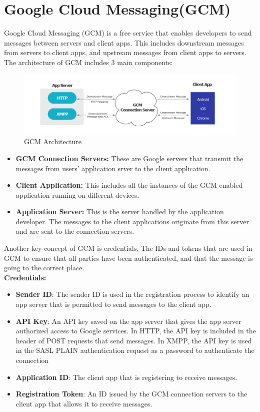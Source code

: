 \section{Google Cloud Messaging(GCM)}
Google Cloud Messaging (GCM) is a free service that enables developers
to send messages between servers and client apps. This includes
downstream messages from servers to client apps, and upstream
messages from client apps to servers. The architecture of GCM includes 3 main components:
\begin{figure}
\centering
\includegraphics[width=15cm]{images/arch.png}
\caption{\label{fig:arch}GCM Architecture}
\end{figure} 
\begin{itemize}
	    \item \textbf{GCM Connection Servers: }These are Google servers that transmit the messages from users' application srver to the client application.
	    \item \textbf{Client Application: }This includes all the instances of the GCM enabled application running on different devices.
	    \item \textbf{Application Server: }This is the server handled by the application developer. The messages to the client applications originate from this server and are sent to the connection servers.
  \end{itemize}

Another key concept of GCM is credentials, The IDs and tokens that are used in GCM to ensure that all parties have been authenticated, and that the message is going to the correct place.\\
\textbf{Credentials:}
\begin{itemize}
	    \item \textbf{Sender ID}: The sender ID is used in the registration process to identify an app server that is permitted to send messages to the client app.
	    \item \textbf{API Key}: An API key saved on the app server that gives the app server authorized access to Google services. In HTTP, the API key is included in the header of POST requests that send messages. In XMPP, the API key is used in the SASL PLAIN authentication request as a password to authenticate the connection
	    \item \textbf{Application ID}: The client app that is registering to receive messages.
	    \item \textbf{Registration Token}: An ID issued by the GCM connection servers to the client app that allows it to receive messages.
	\end{itemize}
